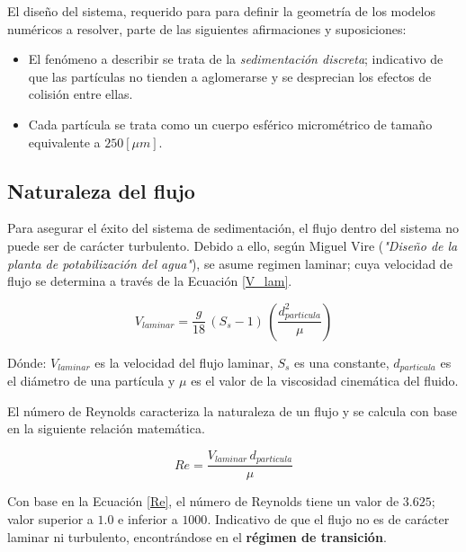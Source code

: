 \noindent
\justify

El dise\~no del sistema, requerido para para definir la geometr\'ia de los modelos num\'ericos a resolver, parte de las siguientes afirmaciones y suposiciones:

\begin{itemize}
	\item El fen\'omeno a describir se trata de la \textit{sedimentaci\'on discreta}; indicativo de que las part\'iculas no tienden a aglomerarse y se desprecian los efectos de colisi\'on entre ellas. 
	\item Cada part\'icula se trata como un cuerpo esf\'erico microm\'etrico de tama\~no equivalente a $250 [\mu m]$.
\end{itemize}

\subsection{Naturaleza del flujo}

\noindent
\justify

Para asegurar el \'exito del sistema de sedimentaci\'on, el flujo dentro del sistema no puede ser de car\'acter turbulento. Debido a ello, seg\'un Miguel Vire (\textit{"Dise\~no de la planta de potabilizaci\'on del agua"}), se asume regimen laminar; cuya velocidad de flujo se determina a trav\'es de la Ecuaci\'on \ref{V_lam}.

\begin{equation}
	V_{laminar} = \frac{g}{18} \, (S_s - 1) \, \left(\frac{d_{particula}^2}{\mu} \right)
	\label{V_lam}
\end{equation}

\noindent
\justify

D\'onde: $V_{laminar}$ es la velocidad del flujo laminar, $S_s$ es una constante, $d_{particula}$ es el di\'ametro de una part\'icula y $\mu$ es el valor de la viscosidad cinem\'atica del fluido.

\noindent
\justify

El n\'umero de Reynolds caracteriza la naturaleza de un flujo y se calcula con base en la siguiente relaci\'on matem\'atica.

\begin{equation}
	Re = \frac{V_{laminar} \, d_{particula}}{\mu}
	\label{Re}
\end{equation}

\noindent
\justify

Con base en la Ecuaci\'on \ref{Re}, el n\'umero de Reynolds tiene un valor de $3.625$; valor superior a $1.0$ e inferior a $1000$. Indicativo de que el flujo no es de car\'acter laminar ni turbulento, encontr\'andose en el \textbf{r\'egimen de transici\'on}.

